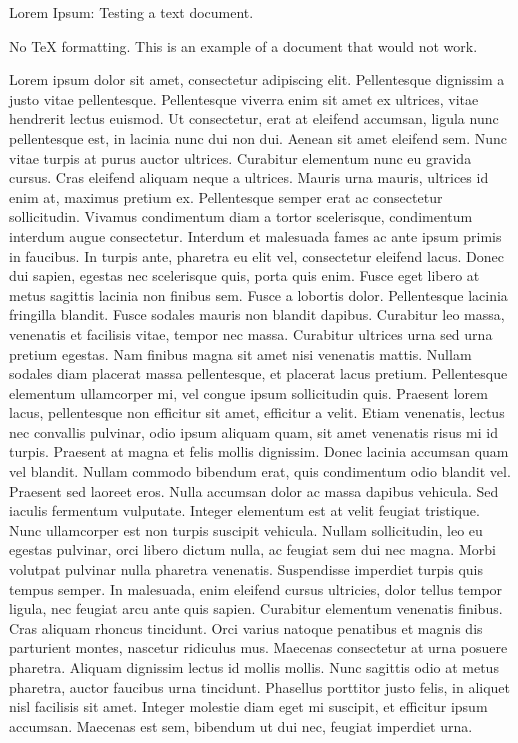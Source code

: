 Lorem Ipsum: Testing a text document.

No TeX formatting. This is an example of a document that would not work.

Lorem ipsum dolor sit amet, consectetur adipiscing elit. Pellentesque dignissim a justo vitae pellentesque. Pellentesque viverra enim sit amet ex ultrices, vitae hendrerit lectus euismod. Ut consectetur, erat at eleifend accumsan, ligula nunc pellentesque est, in lacinia nunc dui non dui. Aenean sit amet eleifend sem. Nunc vitae turpis at purus auctor ultrices. Curabitur elementum nunc eu gravida cursus. Cras eleifend aliquam neque a ultrices. Mauris urna mauris, ultrices id enim at, maximus pretium ex. Pellentesque semper erat ac consectetur sollicitudin. Vivamus condimentum diam a tortor scelerisque, condimentum interdum augue consectetur. Interdum et malesuada fames ac ante ipsum primis in faucibus. In turpis ante, pharetra eu elit vel, consectetur eleifend lacus. Donec dui sapien, egestas nec scelerisque quis, porta quis enim. Fusce eget libero at metus sagittis lacinia non finibus sem. Fusce a lobortis dolor.
Pellentesque lacinia fringilla blandit. Fusce sodales mauris non blandit dapibus. Curabitur leo massa, venenatis et facilisis vitae, tempor nec massa. Curabitur ultrices urna sed urna pretium egestas. Nam finibus magna sit amet nisi venenatis mattis. Nullam sodales diam placerat massa pellentesque, et placerat lacus pretium. Pellentesque elementum ullamcorper mi, vel congue ipsum sollicitudin quis. Praesent lorem lacus, pellentesque non efficitur sit amet, efficitur a velit. Etiam venenatis, lectus nec convallis pulvinar, odio ipsum aliquam quam, sit amet venenatis risus mi id turpis. Praesent at magna et felis mollis dignissim. Donec lacinia accumsan quam vel blandit. Nullam commodo bibendum erat, quis condimentum odio blandit vel. Praesent sed laoreet eros. Nulla accumsan dolor ac massa dapibus vehicula. Sed iaculis fermentum vulputate.
Integer elementum est at velit feugiat tristique. Nunc ullamcorper est non turpis suscipit vehicula. Nullam sollicitudin, leo eu egestas pulvinar, orci libero dictum nulla, ac feugiat sem dui nec magna. Morbi volutpat pulvinar nulla pharetra venenatis. Suspendisse imperdiet turpis quis tempus semper. In malesuada, enim eleifend cursus ultricies, dolor tellus tempor ligula, nec feugiat arcu ante quis sapien. Curabitur elementum venenatis finibus. Cras aliquam rhoncus tincidunt. Orci varius natoque penatibus et magnis dis parturient montes, nascetur ridiculus mus. Maecenas consectetur at urna posuere pharetra. Aliquam dignissim lectus id mollis mollis. Nunc sagittis odio at metus pharetra, auctor faucibus urna tincidunt. Phasellus porttitor justo felis, in aliquet nisl facilisis sit amet. Integer molestie diam eget mi suscipit, et efficitur ipsum accumsan. Maecenas est sem, bibendum ut dui nec, feugiat imperdiet urna.

